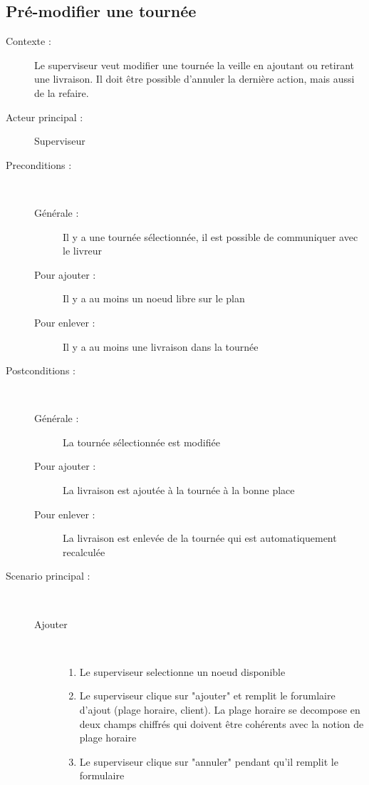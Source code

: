 \subsection{Pr\'e-modifier une tourn\'ee}
\begin{description}
    \item[Contexte :] Le superviseur veut modifier une tourn\'ee la veille en ajoutant ou retirant une livraison. Il doit \^etre possible d'annuler la derni\`ere action, mais aussi de la refaire.
    \item[Acteur principal :] Superviseur
    \item[Preconditions :] ~
    \begin{description}
        \item[G\'en\'erale :] Il y a une tourn\'ee s\'electionn\'ee, il est possible de communiquer avec le livreur
        \item[Pour ajouter :] Il y a au moins un noeud libre sur le plan
        \item[Pour enlever :] Il y a au moins une livraison dans la tourn\'ee
    \end{description}
    \item[Postconditions :] ~
    \begin{description}
        \item[G\'en\'erale :] La tourn\'ee s\'electionn\'ee est modifi\'ee
        \item[Pour ajouter :] La livraison est ajout\'ee \`a la tourn\'ee \`a la bonne place
        \item[Pour enlever :] La livraison est enlev\'ee de la tourn\'ee qui est automatiquement recalcul\'ee
    \end{description}
    \item[Scenario principal :] ~
    \begin{description}
        \item[Ajouter] ~
        \begin{enumerate}
            \item Le superviseur selectionne un noeud disponible
            \item Le superviseur clique sur "ajouter" et remplit le forumlaire d'ajout (plage horaire, client). La plage horaire se decompose en deux champs chiffr\'es qui doivent \^etre coh\'erents avec la notion de plage horaire
            \item Le superviseur clique sur "annuler" pendant qu'il remplit le formulaire
            \begin{enumerate}

\end{enumerate}
\end{enumerate}
\end{description}
\end{description}
